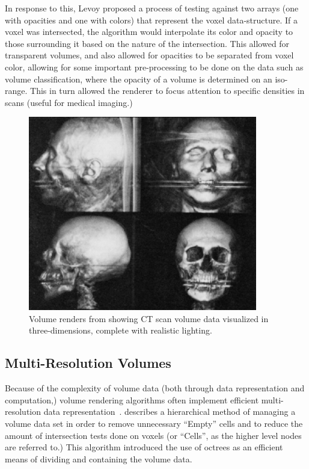 \documentclass[12pt]{ucthesis}
\begin{document}
In response to this, Levoy proposed a process of testing against two arrays (one with opacities and one with colors) that represent the voxel data-structure.  If a voxel was intersected, the algorithm would interpolate its color and opacity to those surrounding it based on the nature of the intersection.  This allowed for transparent volumes, and also allowed for opacities to be separated from voxel color, allowing for some important pre-processing to be done on the data such as volume classification, where the opacity of a volume is determined on an iso-range.  This in turn allowed the renderer to focus attention to specific densities in scans (useful for medical imaging.)

\begin{figure}[h!]
    \centering
    \includegraphics[width=100mm]{img/external/img188.png}
    \caption{Volume renders from \cite{levoy88} showing CT scan volume data visualized in three-dimensions, complete with realistic lighting. }
    \label{fig:levoy}
\end{figure}

\subsection{Multi-Resolution Volumes}
Because of the complexity of volume data (both through data representation and computation,) volume rendering algorithms often implement efficient multi-resolution data representation~\cite{Westermann94}.  \cite{Levoy90} describes a hierarchical method of managing a volume data set in order to remove unnecessary ``Empty'' cells and to reduce the amount of intersection tests done on voxels (or ``Cells'', as the higher level nodes are referred to.)  This algorithm introduced the use of octrees as an efficient means of dividing and containing the volume data.
\end{document}
